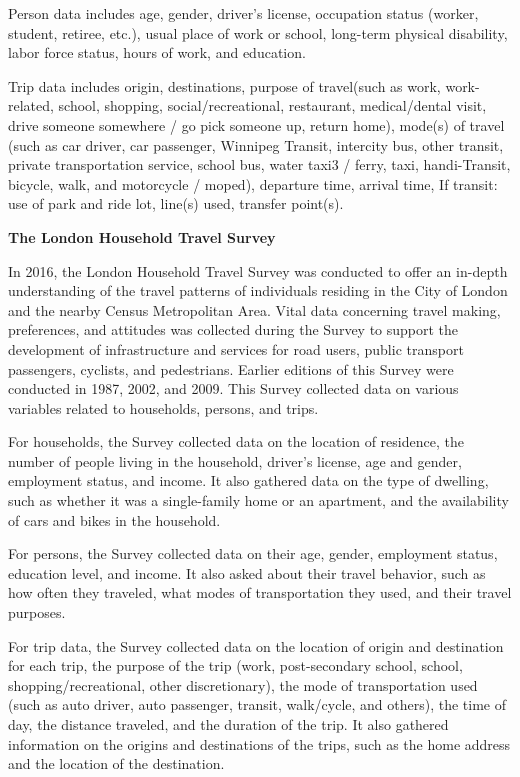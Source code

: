 \documentclass[
11pt, %
oneside, %
english, %
singlespacing, %
]{macthesis} %
\begin{document}
Person data includes age, gender, driver's license, occupation status (worker, student, retiree, etc.), usual place of work or school, long-term physical disability, labor force status, hours of work, and education.

Trip data includes origin, destinations, purpose of travel(such as work, work-related, school, shopping, social/recreational, restaurant, medical/dental visit, drive someone somewhere / go pick someone up, return home), mode(s) of travel (such as car driver, car passenger, Winnipeg Transit, intercity bus, other transit, private transportation service, school bus, water taxi3 / ferry, taxi, handi-Transit, bicycle, walk, and motorcycle / moped), departure time, arrival time, If transit: use of park and ride lot, line(s) used, transfer point(s).

\newpage

\textbf{The London Household Travel Survey}

In 2016, the London Household Travel Survey was conducted to offer an in-depth understanding of the travel patterns of individuals residing in the City of London and the nearby Census Metropolitan Area. Vital data concerning travel making, preferences, and attitudes was collected during the Survey to support the development of infrastructure and services for road users, public transport passengers, cyclists, and pedestrians. Earlier editions of this Survey were conducted in 1987, 2002, and 2009. This Survey collected data on various variables related to households, persons, and trips.

For households, the Survey collected data on the location of residence, the number of people living in the household, driver's license, age and gender, employment status, and income. It also gathered data on the type of dwelling, such as whether it was a single-family home or an apartment, and the availability of cars and bikes in the household.

For persons, the Survey collected data on their age, gender, employment status, education level, and income. It also asked about their travel behavior, such as how often they traveled, what modes of transportation they used, and their travel purposes.

For trip data, the Survey collected data on the location of origin and destination for each trip, the purpose of the trip (work, post-secondary school, school, shopping/recreational, other discretionary), the mode of transportation used (such as auto driver, auto passenger, transit, walk/cycle, and others), the time of day, the distance traveled, and the duration of the trip. It also gathered information on the origins and destinations of the trips, such as the home address and the location of the destination.
\end{document}
